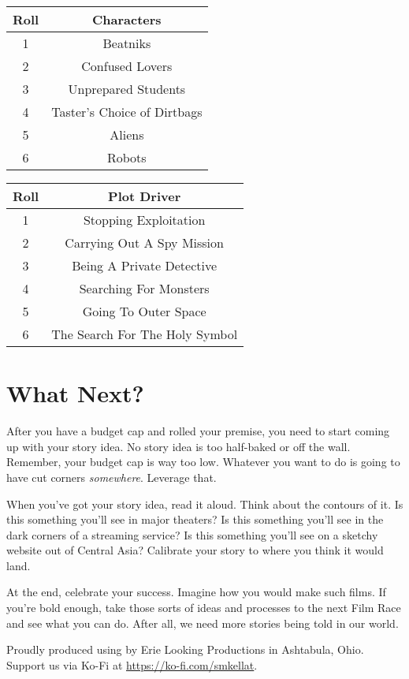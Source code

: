 \documentclass[
notumble,
a5paper
]{leaflet}
\begin{document}
\begin{center}
\begin{tabular}{ |c|c| } 
 \hline
 Roll & Characters \\ 
 \hline
 1 & Beatniks \\
 \hline
 2 & Confused Lovers \\
 \hline
 3 & Unprepared Students \\
 \hline
 4 & Taster's Choice of Dirtbags \\
 \hline
 5 & Aliens \\
 \hline
 6 & Robots \\
 \hline
\end{tabular}
\end{center}

\begin{center}
\begin{tabular}{ |c|c| } 
 \hline
 Roll & Plot Driver \\ 
 \hline
 1 & Stopping Exploitation \\
 \hline
 2 & Carrying Out A Spy Mission \\
 \hline
 3 & Being A Private Detective \\
 \hline
 4 & Searching For Monsters \\
 \hline
 5 & Going To Outer Space \\
 \hline
 6 & The Search For The Holy Symbol \\
 \hline
\end{tabular}
\end{center}

\cleardoublepage

\section*{What Next?}

After you have a budget cap and rolled your premise, you need to start coming up with your story idea.  No story idea is too half-baked or off the wall.  Remember, your budget cap is way too low.  Whatever you want to do is going to have cut corners \emph{somewhere}.  Leverage that.

When you've got your story idea, read it aloud.  Think about the contours of it.  Is this something you'll see in major theaters?  Is this something you'll see in the dark corners of a streaming service?  Is this something you'll see on a sketchy website out of Central Asia?  Calibrate your story to where you think it would land.

At the end, celebrate your success.  Imagine how you would make such films.  If you're bold enough, take those sorts of ideas and processes to the next Film Race and see what you can do.  After all, we need more stories being told in our world.


\clearpage
\clearpage
\doclicenseThis

\begin{center}
Proudly produced using  by Erie Looking Productions in Ashtabula, Ohio.  Support us via Ko-Fi at \url{https://ko-fi.com/smkellat}.
\end{center}
\end{document}

